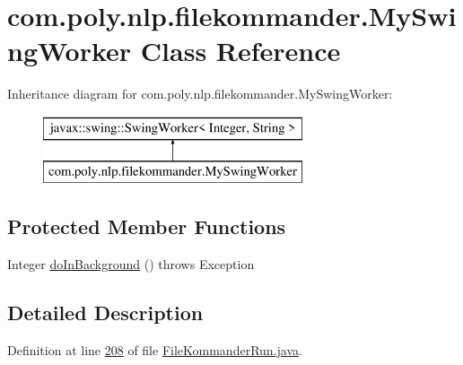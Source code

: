 \hypertarget{classcom_1_1poly_1_1nlp_1_1filekommander_1_1_my_swing_worker}{\section{com.\-poly.\-nlp.\-filekommander.\-My\-Swing\-Worker Class Reference}
\label{classcom_1_1poly_1_1nlp_1_1filekommander_1_1_my_swing_worker}
}
Inheritance diagram for com.\-poly.\-nlp.\-filekommander.\-My\-Swing\-Worker\-:\begin{figure}[H]
\begin{center}
\leavevmode
\includegraphics[height=2.000000cm]{classcom_1_1poly_1_1nlp_1_1filekommander_1_1_my_swing_worker}
\end{center}
\end{figure}
\subsection*{Protected Member Functions}
\begin{DoxyCompactItemize}
\item 
Integer \hyperlink{classcom_1_1poly_1_1nlp_1_1filekommander_1_1_my_swing_worker_a1dba172a61803519edcdd6e034ac1d13}{do\-In\-Background} ()  throws Exception 
\end{DoxyCompactItemize}


\subsection{Detailed Description}


Definition at line \hyperlink{L208}{208} of file \hyperlink{}{File\-Kommander\-Run.\-java}.



